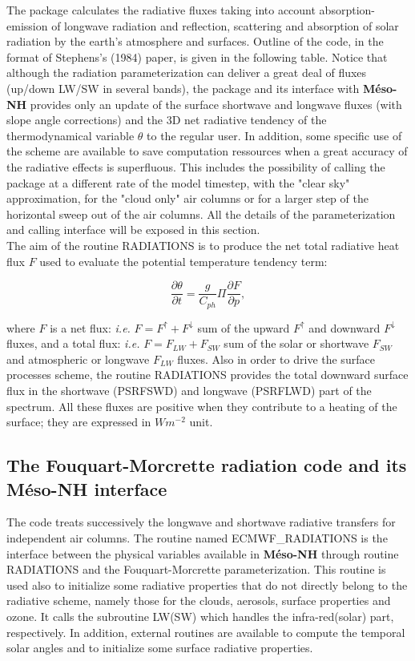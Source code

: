 The package\footnotemark
%
%
calculates the radiative fluxes taking into account
absorption-emission of longwave radiation and reflection, scattering and
absorption of solar radiation by the earth's atmosphere and surfaces.
Outline of the code, in the format of Stephens's (1984) paper, is given
in the following table. Notice that although the radiation parameterization
can deliver a great deal of fluxes (up/down LW/SW in several bands), the
package and its interface with {\bf M\'eso-NH} provides only an update of the
surface shortwave and longwave fluxes (with slope angle corrections) and the 3D
net radiative tendency of the thermodynamical variable $\theta$ to the regular
user. In addition, some specific use of the scheme are available to save
computation ressources when a great accuracy of the radiative effects is
superfluous. This includes the possibility of calling the package at a different
rate of the model timestep, with the "clear sky" approximation, for the "cloud
only" air columns or for a larger step of the horizontal sweep out of the air
columns. All the details of the parameterization and calling interface will be
exposed in this section.\\

The aim of the routine RADIATIONS is to produce the net total radiative heat
flux $F$ used to evaluate the potential temperature tendency term:

$$\frac{\partial \theta}{\partial t} = \frac{g}{C_{ph}}\Pi \frac{\partial F}{\partial p}, $$

\noindent where $F$ is a net flux: {\em i.e.} $F = F^{\!\uparrow} + F^{\!\downarrow}$
sum of the upward $F^{\!\uparrow}$ and downward $F^{\!\downarrow}$ fluxes,
and a total flux: {\em i.e.}  $F = F_{LW} + F_{SW}$ sum of the solar or
shortwave $F_{SW}$ and atmospheric or longwave $F_{LW}$ fluxes. Also in order
to drive the surface processes scheme, the routine RADIATIONS provides the
total downward surface flux in the shortwave (PSRFSWD) and longwave (PSRFLWD)
part of the spectrum. All these fluxes are positive when they contribute to a
heating of the surface; they are expressed in $W m^{-2}$ unit.

%
\subsection{The Fouquart-Morcrette radiation code and its {\bf M\'eso-NH}
interface}
%

The code treats successively the longwave and shortwave radiative transfers for
independent air columns. The routine named ECMWF\_RADIATIONS is the interface
between the physical variables available in {\bf M\'eso-NH} through routine
RADIATIONS and the Fouquart-Morcrette parameterization. This routine is used
also to initialize some radiative properties that do not directly belong to the radiative scheme, namely those for the clouds, aerosols, surface properties and
ozone. It calls the subroutine LW(SW) which handles the infra-red(solar) part,
respectively. In addition, external routines are available to compute the
temporal solar angles and to initialize some surface radiative properties.\\

